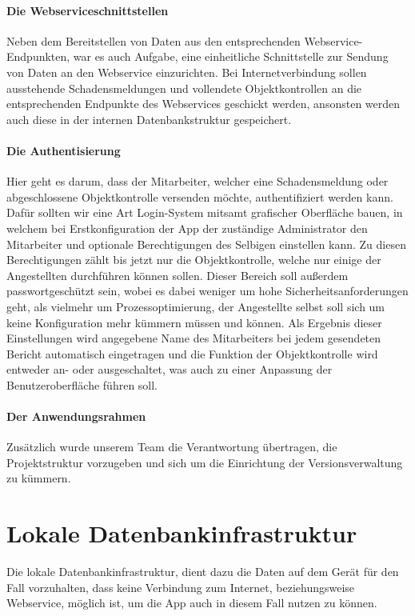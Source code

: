 \documentclass[12pt]{article}
\begin{document}
\paragraph{Die Webserviceschnittstellen} Neben dem Bereitstellen von Daten aus den entsprechenden Webservice-Endpunkten, war es auch Aufgabe, eine einheitliche Schnittstelle zur Sendung von Daten an den Webservice einzurichten. Bei Internetverbindung sollen ausstehende Schadensmeldungen und vollendete Objektkontrollen an die entsprechenden Endpunkte des Webservices geschickt werden, ansonsten werden auch diese in der internen Datenbankstruktur gespeichert.
\paragraph{Die Authentisierung} Hier geht es darum, dass der Mitarbeiter, welcher eine Schadensmeldung oder abgeschlossene Objektkontrolle versenden möchte, authentifiziert werden kann. Dafür sollten wir eine Art Login-System mitsamt grafischer Oberfläche bauen, in welchem bei Erstkonfiguration der App der zuständige Administrator den Mitarbeiter und optionale Berechtigungen des Selbigen einstellen kann. Zu diesen Berechtigungen zählt bis jetzt nur die Objektkontrolle, welche nur einige der Angestellten durchführen können sollen. Dieser Bereich soll außerdem passwortgeschützt sein, wobei es dabei weniger um hohe Sicherheitsanforderungen geht, als vielmehr um Prozessoptimierung, der Angestellte selbst soll sich um keine Konfiguration mehr kümmern müssen und können. Als Ergebnis dieser Einstellungen wird angegebene Name des Mitarbeiters bei jedem gesendeten Bericht automatisch eingetragen und die Funktion der Objektkontrolle wird entweder an- oder ausgeschaltet, was auch zu einer Anpassung der Benutzeroberfläche führen soll.
\paragraph{Der Anwendungsrahmen} Zusätzlich wurde unserem Team die Verantwortung übertragen, die Projektstruktur vorzugeben und sich um die Einrichtung der Versionsverwaltung zu kümmern.

\newpage
\section{Lokale Datenbankinfrastruktur}
Die lokale Datenbankinfrastruktur, dient dazu die Daten auf dem Gerät für den Fall vorzuhalten, dass keine Verbindung zum Internet, beziehungsweise Webservice, möglich ist, um die App auch in diesem Fall nutzen zu können.
\end{document}
